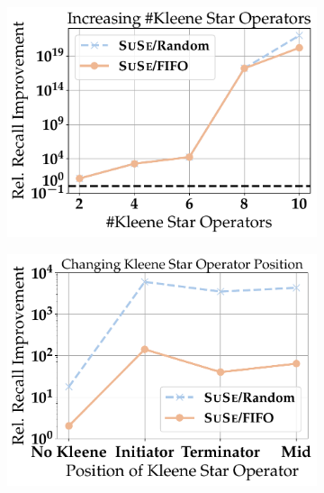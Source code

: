 \begin{figure}[t]
    \vspace{1em} 
	\begin{subfigure}{.38\linewidth}
		\centering
		\includegraphics[width=\linewidth]{revision_plots/number_of_kleene_operators_combined_plot.pdf}
		\vspace{-18pt}
		\caption{}
		\label{plot:number_of_kleenes}
	\end{subfigure}
	\hfill
	\begin{subfigure}{.38\linewidth}
		\centering
		\includegraphics[width=\linewidth]{revision_plots/positional_kleene_plot.pdf}
		\vspace{-18pt}
		\caption{}
		\label{plot:positional_kleene}
	\end{subfigure}


\end{figure}
